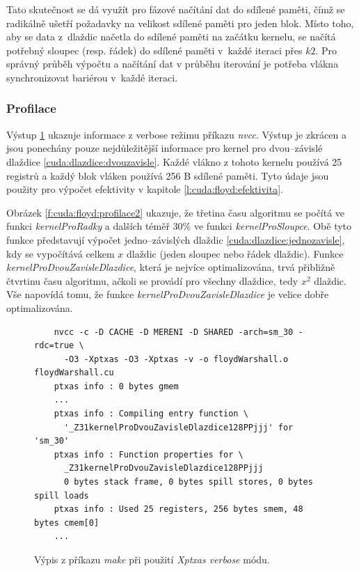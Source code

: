 Tato skutečnost se dá využít pro fázové načítání dat do sdílené paměti, čímž se radikálně ušetří požadavky na velikost sdílené paměti
pro jeden blok. Místo toho, aby se data z~dlaždic načetla do sdílené paměti na začátku kernelu, se načítá potřebný sloupec (resp. řádek)
do sdílené paměti v~každé iteraci přes $k2$. Pro správný průběh výpočtu a načítání dat v průběhu iterování je potřeba vlákna synchronizovat
bariérou v~každé iteraci.


\subsubsection{Profilace} \label{l:cuda:profilace}
Výstup \ref{f:cuda:floyd:profilace} ukazuje informace z verbose režimu příkazu \emph{nvcc}. Výstup je zkrácen a jsou ponechány pouze nejdůležitější informace pro kernel pro dvou--závislé dlaždice \ref{cuda:dlazdice:dvouzavisle}. Každé vlákno z tohoto kernelu používá 25 registrů a každý blok vláken používá 256 B sdílené paměti. Tyto údaje jsou použity pro výpočet efektivity v kapitole \ref{l:cuda:floyd:efektivita}.

Obrázek \ref{f:cuda:floyd:profilace2} ukazuje, že třetina času algoritmu se počítá ve funkci \emph{kernelProRadky} a dalších téměř 30\% ve funkci \emph{kernelProSloupce}. Obě tyto funkce představují výpočet jedno--závislých dlaždic \ref{cuda:dlazdice:jednozavisle}, kdy se vypočítává celkem $x$ dlaždic (jeden sloupec nebo řádek dlaždic). Funkce \emph{kernelProDvouZavisleDlazdice}, která je nejvíce optimalizována, trvá přibližně čtvrtinu času algoritmu, ačkoli se provádí pro všechny dlaždice, tedy $x^2$ dlaždic. Vše napovídá tomu, že funkce \emph{kernelProDvouZavisleDlazdice} je velice dobře optimalizována.

\begin{figure}
	\centering
	\begin{verbatim}
	nvcc -c -D CACHE -D MERENI -D SHARED -arch=sm_30 -rdc=true \
	  -O3 -Xptxas -O3 -Xptxas -v -o floydWarshall.o floydWarshall.cu
	ptxas info : 0 bytes gmem
	...
	ptxas info : Compiling entry function \
	  '_Z31kernelProDvouZavisleDlazdice128PPjjj' for 'sm_30'
	ptxas info : Function properties for \
	  _Z31kernelProDvouZavisleDlazdice128PPjjj
	  0 bytes stack frame, 0 bytes spill stores, 0 bytes spill loads
	ptxas info : Used 25 registers, 256 bytes smem, 48 bytes cmem[0]
	...
	\end{verbatim}
	\caption{Výpis z příkazu \emph{make} při použití \emph{Xptxas verbose} módu.}
    \label{f:cuda:floyd:profilace}
\end{figure}


